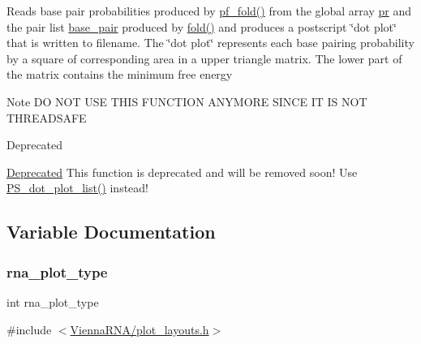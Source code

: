 Reads base pair probabilities produced by \hyperlink{group__pf__fold_gadc3db3d98742427e7001a7fd36ef28c2}{pf\+\_\+fold()} from the global array \hyperlink{fold__vars_8h_ac98ec419070aee6831b44e5c700f090f}{pr} and the pair list \hyperlink{fold__vars_8h_a0244a629b5ab4f58b77590c3dfd130dc}{base\+\_\+pair} produced by \hyperlink{group__mfe__fold__single_gaadafcb0f140795ae62e5ca027e335a9b}{fold()} and produces a postscript \char`\"{}dot plot\char`\"{} that is written to \textquotesingle{}filename\textquotesingle{}. The \char`\"{}dot plot\char`\"{} represents each base pairing probability by a square of corresponding area in a upper triangle matrix. The lower part of the matrix contains the minimum free energy \begin{DoxyNote}{Note}
DO N\+OT U\+SE T\+H\+IS F\+U\+N\+C\+T\+I\+ON A\+N\+Y\+M\+O\+RE S\+I\+N\+CE IT IS N\+OT T\+H\+R\+E\+A\+D\+S\+A\+FE
\end{DoxyNote}
\begin{DoxyRefDesc}{Deprecated}
\item[\hyperlink{deprecated__deprecated000131}{Deprecated}]This function is deprecated and will be removed soon! Use \hyperlink{group__plotting__utils_ga00ea223b5cf02eb2faae5ff29f0d5e12}{P\+S\+\_\+dot\+\_\+plot\+\_\+list()} instead! \end{DoxyRefDesc}


\subsection{Variable Documentation}
\mbox{\label{group__plotting__utils_ga5964c4581431b098b80027d6e14dcdd4}} 
\subsubsection{\texorpdfstring{rna\+\_\+plot\+\_\+type}{rna\_plot\_type}}
{\footnotesize\ttfamily int rna\+\_\+plot\+\_\+type}



{\ttfamily \#include $<$\hyperlink{plot__layouts_8h}{Vienna\+R\+N\+A/plot\+\_\+layouts.\+h}$>$}



